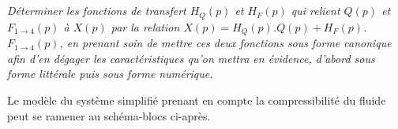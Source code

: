 \documentclass[10pt,fleqn]{article} %
\begin{document}
\begin{multicols}{2}
%
%

\subparagraph{}\textit{ Déterminer les fonctions de transfert $H_{Q}(p)$ et $H_{F}(p)$ qui relient $Q(p)$ et ${F}_{1 \rightarrow 4}(p)$ à $X(p)$ par la relation $X(p)={H}_{Q}(p)$.$Q(p)+{H}_{F}(p)$.${F}_{1 \rightarrow 4}(p)$, en prenant soin de mettre ces deux fonctions sous forme canonique afin d'en dégager les caractéristiques qu'on mettra en évidence, d'abord sous forme littérale puis sous forme numérique.}




 Le modèle du système simplifié prenant en compte la compressibilité du fluide peut se ramener au schéma-blocs ci-après.%

\begin{center}
{}
\end{center}


%
%
%
%



\end{multicols}
\end{document}
